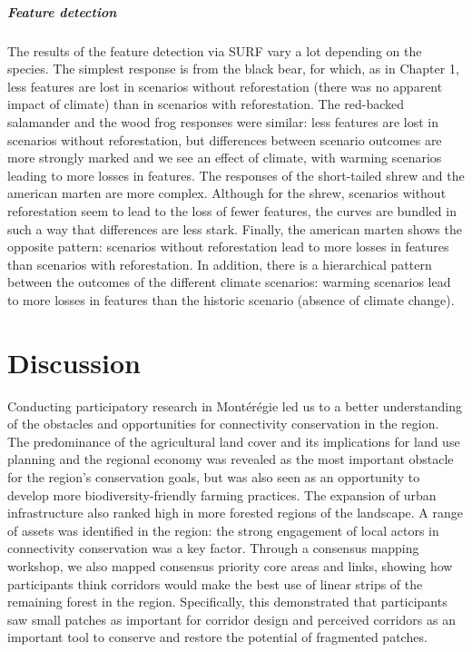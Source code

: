 {\subparagraph*{\textit{Feature detection}} The results of the feature detection via SURF vary a lot depending on the species. The simplest response is from the black bear, for which, as in Chapter 1, less features are lost in scenarios without reforestation (there was no apparent impact of climate) than in scenarios with reforestation. The red-backed salamander and the wood frog responses were similar: less features are lost in scenarios without reforestation, but differences between scenario outcomes are more strongly marked and we see an effect of climate, with warming scenarios leading to more losses in features. The responses of the short-tailed shrew and the american marten are more complex. Although for the shrew, scenarios without reforestation seem to lead to the loss of fewer features, the curves are bundled in such a way that differences are less stark. Finally, the american marten shows the opposite pattern: scenarios without reforestation lead to more losses in features than scenarios with reforestation. In addition, there is a hierarchical pattern between the outcomes of the different climate scenarios: warming scenarios lead to more losses in features than the historic scenario (absence of climate change).\\

\section{Discussion}

Conducting participatory research in Montérégie led us to a better understanding of the obstacles and opportunities for connectivity conservation in the region. The predominance of the agricultural land cover and its implications for land use planning and the regional economy was revealed as the most important obstacle for the region’s conservation goals, but was also seen as an opportunity to develop more biodiversity-friendly farming practices. The expansion of urban infrastructure also ranked high in more forested regions of the landscape. A range of assets was identified in the region: the strong engagement of local actors in connectivity conservation was a key factor. Through a consensus mapping workshop, we also mapped consensus priority core areas and links, showing how participants think corridors would make the best use of linear strips of the remaining forest in the region. Specifically, this demonstrated that participants saw small patches as important for corridor design and perceived corridors as an important tool to conserve and restore the potential of fragmented patches. 

}
